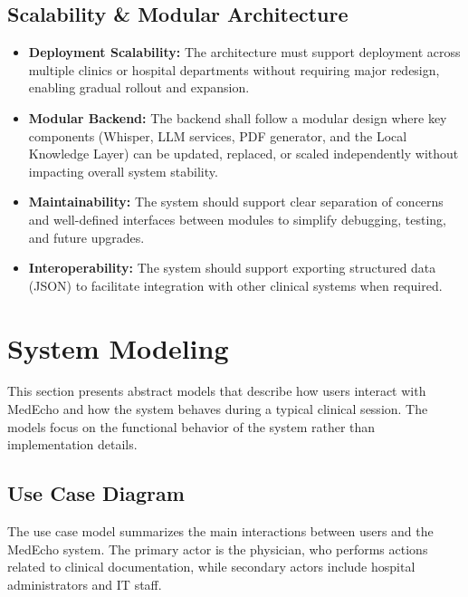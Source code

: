 \subsection{Scalability \& Modular Architecture}\label{sec:analysis:nfr:scalability}

\begin{itemize}
    \item \textbf{Deployment Scalability:} The architecture must support deployment across multiple clinics or hospital departments without requiring major redesign, enabling gradual rollout and expansion.

    \item \textbf{Modular Backend:} The backend shall follow a modular design where key components (Whisper, LLM services, PDF generator, and the Local Knowledge Layer) can be updated, replaced, or scaled independently without impacting overall system stability.

    \item \textbf{Maintainability:} The system should support clear separation of concerns and well-defined interfaces between modules to simplify debugging, testing, and future upgrades.

    \item \textbf{Interoperability:} The system should support exporting structured data (JSON) to facilitate integration with other clinical systems when required.
\end{itemize}


\section{System Modeling}\label{sec:analysis:modeling}

This section presents abstract models that describe how users interact with MedEcho and how the system behaves during a typical clinical session. The models focus on the functional behavior of the system rather than implementation details.
\subsection{Use Case Diagram}\label{sec:analysis:usecases}

The use case model summarizes the main interactions between users and the MedEcho system. The primary actor is the physician, who performs actions related to clinical documentation, while secondary actors include hospital administrators and IT staff.

